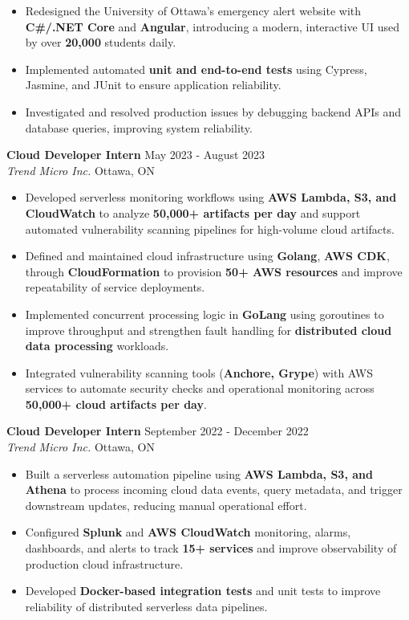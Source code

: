 \documentclass[a4paper]{article}
\begin{document}
\vspace{-2mm}
\begin{itemize} \itemsep -2pt
    \item Redesigned the University of Ottawa's emergency alert website with \textbf{C\#/.NET Core} and \textbf{Angular}, introducing a modern, interactive UI used by over \textbf{20,000} students daily.
    \item Implemented automated \textbf{unit and end-to-end tests} using Cypress, Jasmine, and JUnit to ensure application reliability.
    \item Investigated and resolved production issues by debugging backend APIs and database queries, improving system reliability.
\end{itemize}
\textbf{Cloud Developer Intern} \hfill May 2023 - August 2023\\
\textit{Trend Micro Inc.} \hfill Ottawa, ON\\
\vspace{-2mm}
\begin{itemize} \itemsep -2pt
    \item Developed serverless monitoring workflows using \textbf{AWS Lambda, S3, and CloudWatch} to analyze \textbf{50,000+ artifacts per day} and support automated vulnerability scanning pipelines for high-volume cloud artifacts.
\item Defined and maintained cloud infrastructure using \textbf{Golang}, \textbf{AWS CDK}, through \textbf{CloudFormation} to provision \textbf{50+ AWS resources} and improve repeatability of service deployments.
\item Implemented concurrent processing logic in \textbf{GoLang} using goroutines to improve throughput and strengthen fault handling for \textbf{distributed cloud data processing} workloads.
\item Integrated vulnerability scanning tools (\textbf{Anchore, Grype}) with AWS services to automate security checks and operational monitoring across \textbf{50,000+ cloud artifacts per day}.
\end{itemize}
\textbf{Cloud Developer Intern} \hfill September 2022 - December 2022\\
\textit{Trend Micro Inc.} \hfill Ottawa, ON\\
\vspace{-2mm}
\begin{itemize} \itemsep -2pt
        \item Built a serverless automation pipeline using \textbf{AWS Lambda, S3, and Athena} to process incoming cloud data events, query metadata, and trigger downstream updates, reducing manual operational effort.
\item Configured \textbf{Splunk} and \textbf{AWS CloudWatch} monitoring, alarms, dashboards, and alerts to track \textbf{15+ services} and improve observability of production cloud infrastructure.
\item Developed \textbf{Docker-based integration tests} and unit tests to improve reliability of distributed serverless data pipelines.
\end{itemize}
\vspace{5mm}
\end{document}
